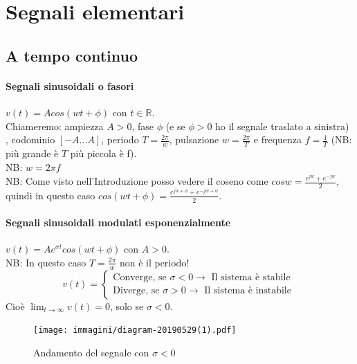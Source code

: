 \chapter{Segnali elementari}
\section{A tempo continuo}

\subsubsection{Segnali sinusoidali o fasori}

$ v(t)= Acos(wt+ \phi)$ con $t \in \mathbb{R}$.\\
Chiameremo: ampiezza $ A>0$, fase $ \phi $ (e se $ \phi > 0$ ho il segnale traslato a sinistra) , codominio $ [-A...A]$, periodo $ T = \frac{2 \pi}{w} $, pulsazione $w=\frac{2 \pi}{T} $ e frequenza $ f = \frac{1}{T}$ (NB: più grande è $T $ più piccola è f).\\
NB: $ w = 2 \pi f $ \\
NB: Come visto nell'Introduzione posso vedere il coseno come $  cosw = \frac{e^{jw} + e^{-jw}}{2}  $, quindi in questo caso $ cos(wt + \phi) = \frac{e^{jw+ \phi} + e^{-jw + \phi}}{2} $.\\

\subsubsection{Segnali sinusoidali modulati esponenzialmente}

$ v(t)= A e^{ \sigma t} cos(wt+ \phi)$ con $A>0$.\\
NB: In questo caso $T = \frac{2 \pi}{w} $ non è il periodo!\\

\begin{equation*}
v(t)=
\begin{cases} 
 \mbox{Converge, se } \sigma < 0 \rightarrow \mbox{ Il sistema è stabile }\\ 
 \mbox{Diverge, se } \sigma > 0 \rightarrow \mbox{ Il sistema è instabile}
\end{cases} 
\end{equation*}
Cioè $  \lim_{t \to \infty} v(t)=0$, solo se $ \sigma <0$.

\begin{figure}[h]
	\centering
	\texttt{[image: immagini/diagram-20190529(1).pdf]}
	\caption{ Andamento del segnale con $ \sigma <0$ }
	\label{fig: segnSinNeg}
\end{figure}

